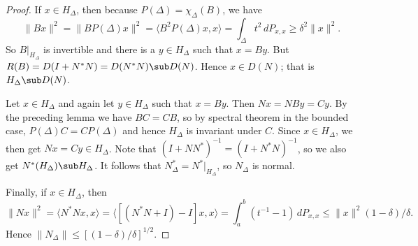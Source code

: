 \begin{proof}
If $x\in H_\Delta$, then because $P(\Delta)=\chi_{\Delta}(B)$, we have
\[\|Bx\|^2=\|BP(\Delta)x\|^2=\langle B^2P(\Delta)x,x\rangle=\int_\Delta t^2\,dP_{x,x}\geq\delta^2\|x\|^2.\]
So $B|_{H_\Delta}$ is invertible and there is a $y\in H_\Delta$ such that $x=By$. But $R(B)=D(I+N^*N)=D(N^*N)\sub D(N)$. Hence $x\in D(N)$; that is $H_\Delta\sub D(N)$.\par
Let $x\in H_\Delta$ and again let $y\in H_\Delta$ such that $x=By$. Then $Nx=NBy=Cy$. By the preceding lemma we have $BC=CB$, so by spectral theorem in the bounded case, $P(\Delta)C=CP(\Delta)$ and hence $H_\Delta$ is invariant under $C$. Since $x\in H_\Delta$, we then get $Nx=Cy\in H_\Delta$. Note that $(I+NN^*)^{-1}=(I+N^*N)^{-1}$, so we also get $N^*(H_\Delta)\sub H_\Delta$. It follows that $N_\Delta^*=N^*|_{H_\Delta}$, so $N_\Delta$ is normal.\par
Finally, if $x\in H_\Delta$, then
\[\|Nx\|^2=\langle N^*Nx,x\rangle=\langle[(N^*N+I)-I]x,x\rangle=\int_a^b(t^{-1}-1)\,dP_{x,x}\leq\|x\|^2(1-\delta)/\delta.\]
Hence $\|N_\Delta\|\leq[(1-\delta)/\delta]^{1/2}$.
\end{proof}
